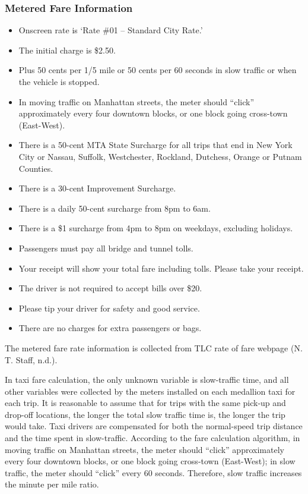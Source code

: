 \documentclass[12pt,twoside]{reedthesis}
\providecommand{\tightlist}{%
  \setlength{\itemsep}{0pt}\setlength{\parskip}{0pt}}
\theoremstyle{definition}
\theoremstyle{definition}
\theoremstyle{definition}
\theoremstyle{remark}
\begin{document}
\subsubsection{Metered Fare Information}\label{metered-fare-information}
\begin{itemize}
\tightlist
\item
  Onscreen rate is `Rate \#01 -- Standard City Rate.'
\item
  The initial charge is \$2.50.
\item
  Plus 50 cents per 1/5 mile or 50 cents per 60 seconds in slow traffic
  or when the vehicle is stopped.
\item
  In moving traffic on Manhattan streets, the meter should ``click''
  approximately every four downtown blocks, or one block going
  cross-town (East-West).
\item
  There is a 50-cent MTA State Surcharge for all trips that end in New
  York City or Nassau, Suffolk, Westchester, Rockland, Dutchess, Orange
  or Putnam Counties.
\item
  There is a 30-cent Improvement Surcharge.
\item
  There is a daily 50-cent surcharge from 8pm to 6am.
\item
  There is a \$1 surcharge from 4pm to 8pm on weekdays, excluding
  holidays.
\item
  Passengers must pay all bridge and tunnel tolls.
\item
  Your receipt will show your total fare including tolls. Please take
  your receipt.
\item
  The driver is not required to accept bills over \$20.
\item
  Please tip your driver for safety and good service.
\item
  There are no charges for extra passengers or bags.
\end{itemize}
The metered fare rate information is collected from TLC rate of fare
webpage (N. T. Staff, n.d.).

In taxi fare calculation, the only unknown variable is slow-traffic
time, and all other variables were collected by the meters installed on
each medallion taxi for each trip. It is reasonable to assume that for
trips with the same pick-up and drop-off locations, the longer the total
slow traffic time is, the longer the trip would take. Taxi drivers are
compensated for both the normal-speed trip distance and the time spent
in slow-traffic. According to the fare calculation algorithm, in moving
traffic on Manhattan streets, the meter should ``click'' approximately
every four downtown blocks, or one block going cross-town (East-West);
in slow traffic, the meter should ``click'' every 60 seconds. Therefore,
slow traffic increases the minute per mile ratio.
\end{document}
